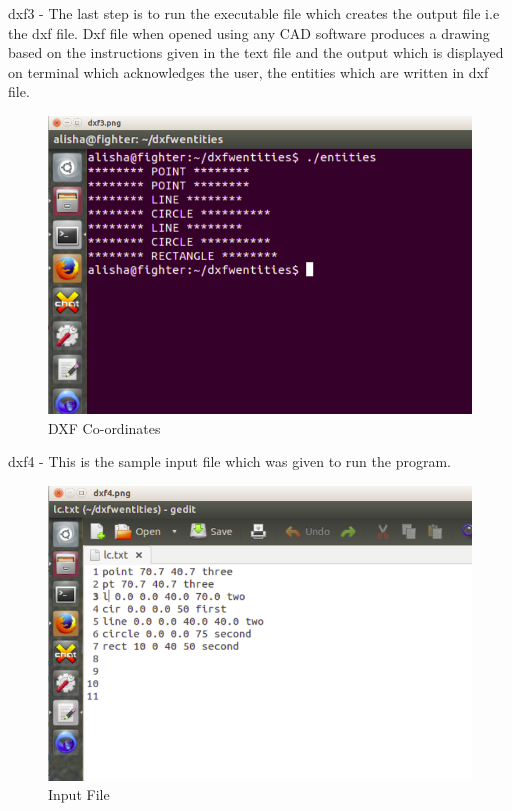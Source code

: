 dxf3 - The last step is to run the executable file which creates the output file i.e the dxf file. Dxf file when opened using any CAD software produces a drawing based on the instructions given in the text file and the output which is displayed on terminal which acknowledges the user, the entities which are written in dxf file.
\begin{figure} [h!]
\centering
\includegraphics[scale=0.2]{images/dxf3.png}
\caption{DXF Co-ordinates}
\end{figure}

dxf4 - This is the sample input file which was given to run the program.
\begin{figure} [h!]
\centering
\includegraphics[scale=0.2]{images/dxf4.png}
\caption{Input File}
\end{figure}
 
